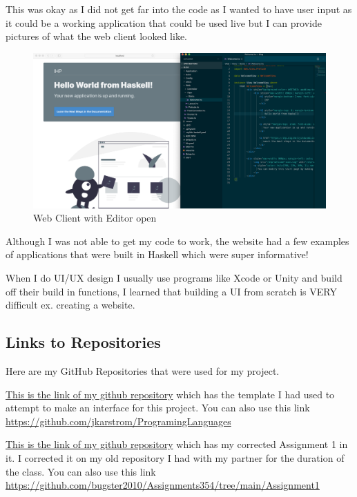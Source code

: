 \documentclass{article}
\begin{document}
\medskip\noindent 
 This was okay as I did not get far into the code as I wanted to have user input as it could be a working application that could be used live but I can provide pictures of what the web client looked like.
 
\medskip\noindent 
\begin{figure}[htp]
    \centering
    \includegraphics[width=17cm]{hello-world-2.png}
    \caption{Web Client with Editor open}
    \label{fig:Web Client with Editor open}
\end{figure}
\cite{IHP}

\medskip\noindent
Although I was not able to get my code to work, the website had a few examples of applications that were built in Haskell which were super informative! 

\medskip\noindent
When I do UI/UX design I usually use programs like Xcode or Unity and build off their build in functions, I learned that building a UI from scratch is VERY difficult ex. creating a website.

\subsection{Links to Repositories}
Here are my GitHub Repositories that were used for my project.

\medskip\noindent
\href{https://github.com/jkarstrom/ProgramingLanguages}{This is the link of my github repository} which has the template I had used to attempt to make an interface for this project. You can also use this link \url{https://github.com/jkarstrom/ProgramingLanguages}

\medskip\noindent
\href{https://github.com/bugster2010/Assignments354/tree/main/Assignment1}{This is the link of my github repository} which has my corrected Assignment 1 in it. I corrected it on my old repository I had with my partner for the duration of the class. You can also use this link \url{https://github.com/bugster2010/Assignments354/tree/main/Assignment1}
\end{document}
